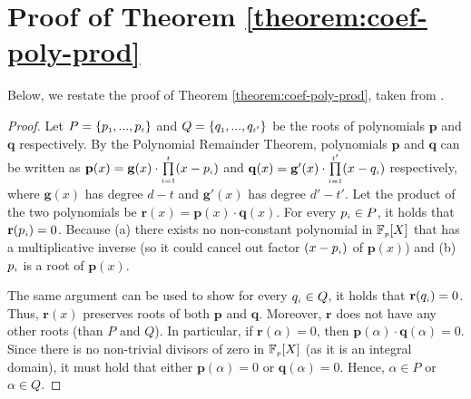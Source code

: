 

\section{Proof of Theorem \ref{theorem:coef-poly-prod}}\label{sec::proof-of-poly-union}

Below, we restate the proof of Theorem \ref{theorem:coef-poly-prod}, taken from \cite{AbadiMZ21}.

\begin{proof}
Let $P=\{p_{\scriptscriptstyle 1},...,p_{\scriptscriptstyle t}\}$ and $Q=\{q_{\scriptscriptstyle 1},...,q_{\scriptscriptstyle t'}\}$ be the roots of polynomials $\mathbf{p}$ and   $\mathbf{q}$  respectively.  By the Polynomial Remainder Theorem,  polynomials $\mathbf{p}$ and $\mathbf{q}$  can be written as $\mathbf{p}(x)=\mathbf{g}(x)\cdot\prod\limits_{\scriptscriptstyle i=1}^{\scriptscriptstyle t}(x-p_{\scriptscriptstyle i})$ and $\mathbf{q}(x)=\mathbf{g}'(x)\cdot\prod\limits_{\scriptscriptstyle i=1}^{\scriptscriptstyle t'}(x-q_{\scriptscriptstyle i})$ respectively, where $\mathbf{g}(x)$ has degree $d-t$ and $\mathbf{g}'(x)$ has degree $d'-t'$. Let the product of the two polynomials be $\mathbf{r}(x)=\mathbf{p}(x)\cdot \mathbf{q}(x)$. For every $p_{\scriptscriptstyle i}\in P$, it holds  that $\mathbf{r}(p_{\scriptscriptstyle i})=0$. Because (a) there exists no non-constant polynomial in $\mathbb{F}_{\scriptscriptstyle p}[X]$ that has a multiplicative inverse (so it could cancel out factor $(x-p_{\scriptscriptstyle i})$ of $\mathbf{p}(x)$) and (b) $p_{\scriptscriptstyle i}$ is a root of $\mathbf{p}(x)$. 

The same argument  can be used to show for every $q_{\scriptscriptstyle i}\in Q$, it holds that $\mathbf{r}(q_{\scriptscriptstyle i})=0$. Thus, $\mathbf{r}(x)$ preserves  roots of  both  $\mathbf{p}$ and $\mathbf{q}$. Moreover, $\mathbf{r}$ does not have any other roots (than $P$ and $Q$). In particular, if $\mathbf{r}(\alpha)=0$, then $\mathbf{p}(\alpha)\cdot \mathbf{q}(\alpha)=0$. Since there is no non-trivial divisors of zero in $\mathbb{F}_{\scriptscriptstyle p}[X]$  (as it is an integral domain), it must hold that either $\mathbf{p}(\alpha)=0$ or $\mathbf{q}(\alpha)=0$. Hence, $\alpha\in P$ or $\alpha\in Q$.  %
%
\end{proof}
\clearpage

%
